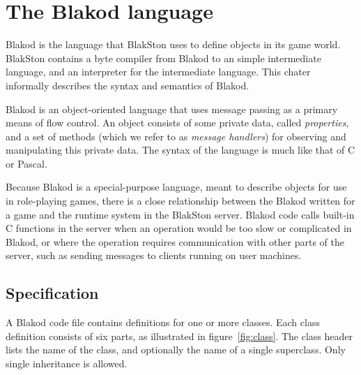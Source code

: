 \newcommand{\class}[1]{\textbf{#1}}
\newcommand{\prop}[1]{\texttt{#1}}

\newenvironment{leftlines}
{\setlength{\oldindent}{\parindent}
 \setlength{\parindent}{0in}\vspace{\baselineskip}}
{\setlength{\parindent}{\oldindent}\vspace{\baselineskip}}

\newcommand{\function}[2]{ {\tt #1(} {\em #2} {\tt )} }

\chapter{The Blakod language}

Blakod is the language that BlakSton uses to define objects in its
game world.  BlakSton contains a byte compiler from Blakod to an
simple intermediate language, and an interpreter for the intermediate
language.  This chater informally describes the syntax and semantics of
Blakod.  

Blakod is an object-oriented language that uses message passing as a
primary means of flow control.  An object consists of some private
data, called {\em properties\/}, and a set of methods (which we refer
to as {\em message handlers\/}) for observing and manipulating this
private data.  The syntax of the language is much like that of
C or Pascal.  

Because Blakod is a special-purpose language, meant to describe
objects for use in role-playing games, there is a close relationship
between the Blakod written for a game and the runtime system in the
BlakSton server.  Blakod code calls built-in C functions in the server
when an operation would be too slow or complicated in Blakod, or where
the operation requires communication with other parts of the server,
such as sending messages to clients running on user machines.

\section{Specification}

A Blakod code file contains definitions for one or more classes.  Each
class definition consists of six parts, as illustrated in
figure~\ref{fig:class}.  The class header lists the name of the class,
and optionally the name of a single superclass.  Only single
inheritance is allowed.


